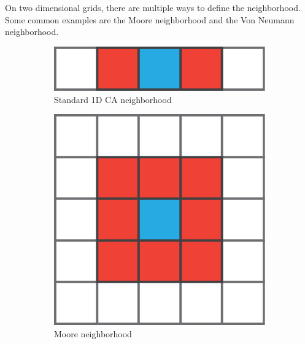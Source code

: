 On two dimensional grids, there are multiple ways to define the neighborhood.
Some common examples are the Moore neighborhood and the Von Neumann neighborhood.

\begin{figure}[htbp]
  \centering
  \begin{subfigure}[c]{.3\linewidth}
    \centering
    \includegraphics[width=\linewidth]{figures/1d_neigh}
    \caption{Standard 1D \ac{CA} neighborhood}
    \label{fig:1d_neigh}
  \end{subfigure}
  \begin{subfigure}[c]{.3\linewidth}
    \centering
    \includegraphics[width=\linewidth]{figures/moore}
    \caption{Moore neighborhood}
    \label{fig:moore}
  \end{subfigure}
  \begin{subfigure}[c]{.3\linewidth}
    \centering

\end{subfigure}
\end{figure}
